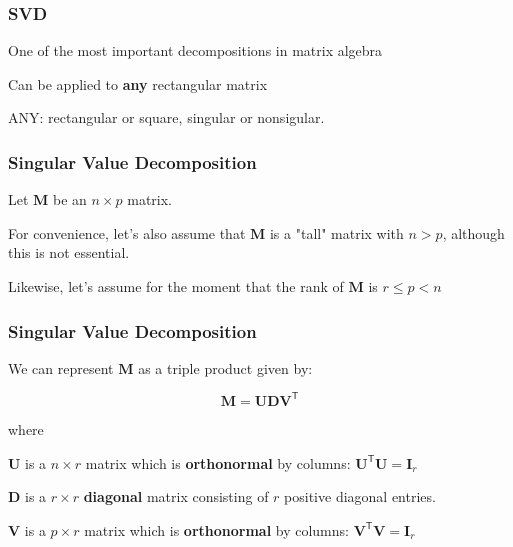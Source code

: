 \documentclass[12pt]{beamer}\usepackage[]{graphicx}\usepackage[]{color}
\begin{document}

\begin{frame}
\frametitle{SVD}

\bbi
  \item One of the most important decompositions in matrix algebra
  \item Can be applied to {\hilit \textbf{any}} rectangular matrix
  \item ANY: rectangular or square, singular or nonsigular.
\ei
\eb

\end{frame}

  
\begin{frame}
\frametitle{Singular Value Decomposition}

Let $\mathbf{M}$ be an $n \times p$ matrix.

\bigskip
For convenience, let's also assume that
$\mathbf{M}$ is a "tall" matrix with $n > p$, although this is not essential.

\bigskip
Likewise, let's assume for the moment that the rank of $\mathbf{M}$ is $r \leq p < n$

\end{frame}

  
\begin{frame}
\frametitle{Singular Value Decomposition}

We can represent $\mathbf{M}$ as a triple product given by:

$$ 
\mathbf{M = U D V^\mathsf{T}}
$$

where
\bi
 \item $\mathbf{U}$ is a $n \times r$ matrix which is \textbf{orthonormal} by columns:
 $\mathbf{U^\mathsf{T} U} = \mathbf{I}_r$
 \item $\mathbf{D}$ is a $r \times r$ \textbf{diagonal} matrix consisting of $r$ positive diagonal entries.
 \item $\mathbf{V}$ is a $p \times r$ matrix which is \textbf{orthonormal} by columns:
 $\mathbf{V^\mathsf{T} V} = \mathbf{I}_r$
\ei

\end{frame}

  
\end{document}
